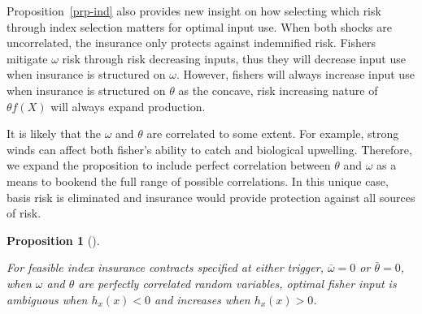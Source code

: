 \documentclass[
  letterpaper,
  DIV=11,
  numbers=noendperiod]{scrartcl}
\theoremstyle{plain}
\theoremstyle{plain}
\newtheorem{proposition}{Proposition}[section]
\theoremstyle{remark}
\begin{document}
Proposition~\ref{prp-ind} also provides new insight on how selecting
which risk through index selection matters for optimal input use. When
both shocks are uncorrelated, the insurance only protects against
indemnified risk. Fishers mitigate \(\omega\) risk through risk
decreasing inputs, thus they will decrease input use when insurance is
structured on \(\omega\). However, fishers will always increase input
use when insurance is structured on \(\theta\) as the concave, risk
increasing nature of \(\theta f(X)\) will always expand production.

It is likely that the \(\omega\) and \(\theta\) are correlated to some
extent. For example, strong winds can affect both fisher's ability to
catch and biological upwelling. Therefore, we expand the proposition to
include perfect correlation between \(\theta\) and \(\omega\) as a means
to bookend the full range of possible correlations. In this unique case,
basis risk is eliminated and insurance would provide protection against
all sources of risk.

\begin{proposition}[]\protect\hypertarget{prp-corr}{}\label{prp-corr}

For feasible index insurance contracts specified at either trigger,
\(\bar\omega=0\) or \(\bar\theta=0\), when \(\omega\) and \(\theta\) are
perfectly correlated random variables, optimal fisher input is ambiguous
when \(h_x(x)<0\) and increases when \(h_x(x)>0\).

\end{proposition}
\end{document}
